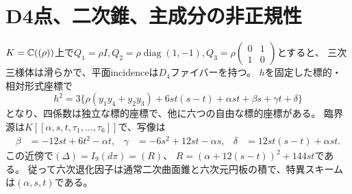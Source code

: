 \section{D4点、二次錐、主成分の非正規性}
\begin{theorem}\label{mh:d4}
$K=\mathbb C((\rho))$上で$Q_1=\rho I,Q_2=\rho\operatorname{diag}(1,-1),
Q_3=\rho\left(\begin{smallmatrix}0&1\\1&0\end{smallmatrix}\right)$とすると、
三次三様体は滑らかで、平面incidenceは$D_4$ファイバーを持つ。
$h$を固定した標的・相対形式座標で
\[
 h^2=3\{\rho(y_1y_4+y_2y_3)+6st(s-t)+\alpha st+\beta s+\gamma t+\delta\}
\]
となり、四係数は独立な標的座標で、他に六つの自由な標的座標がある。
臨界源は$K[[\alpha,s,t,\tau_1,\ldots,\tau_6]]$で、写像は
\begin{align*}
 \beta&=-12st+6t^2-\alpha t,&
 \gamma&=-6s^2+12st-\alpha s,&
 \delta&=12st(s-t)+\alpha st.
\end{align*}
この近傍で$(\Delta)=I_9(d\pi)=(R)$、
$R=(\alpha+12(s-t))^2+144st$である。
従って六次退化因子は通常二次曲面錐と六次元円板の積で、特異スキームは$(\alpha,s,t)$である。
\end{theorem}
